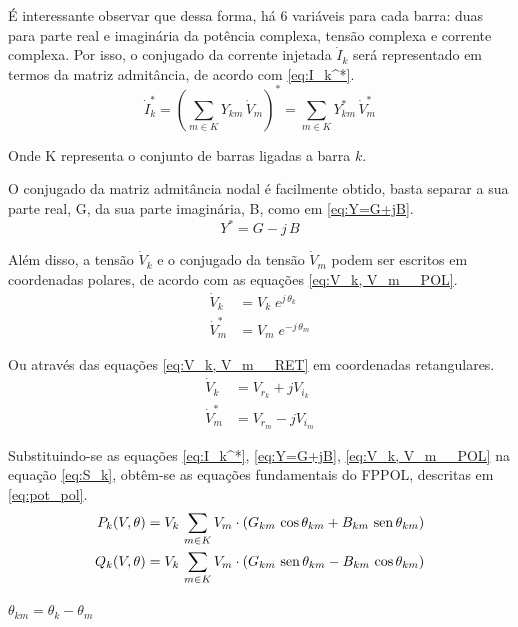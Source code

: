 É interessante observar que dessa forma, há 6 variáveis para cada barra: duas para parte real e imaginária da potência complexa, tensão complexa e corrente complexa. Por isso, o conjugado da corrente injetada $\Dot I_k$ será representado em termos da matriz admitância, de acordo com \eqref{eq:I_k^*}.
\begin{equation} \label{eq:I_k^*}
    \Dot I_k^* = (\sum_{m \in K} Y_{km}\, \Dot V_m)^* = \sum_{m \in K} Y_{km}^*\, \Dot V_m^* 
\end{equation}

Onde K representa o conjunto de barras ligadas a barra $k$.

O conjugado da matriz admitância nodal é facilmente obtido, basta separar a sua parte real, \ac{G}, da sua parte imaginária, \ac{B}, como em \eqref{eq:Y=G+jB}.
\begin{equation} \label{eq:Y=G+jB}
        Y^* = G - j\,B
\end{equation}

Além disso, a tensão $\Dot V_k$ e o conjugado da tensão $\Dot V_m$ podem ser escritos em coordenadas polares, de acordo com as equações \eqref{eq:V_k, V_m__POL}.
\begin{equation} \label{eq:V_k, V_m__POL}
    \begin{split}
        \Dot{V}_k &= V_k \; e^{j \, \theta_k}\\
        \Dot{V}^*_m &= V_m \; e^{-j \, \theta_m}
    \end{split}
\end{equation}

Ou através das equações \eqref{eq:V_k, V_m__RET} em coordenadas retangulares.
\begin{equation} \label{eq:V_k, V_m__RET}
    \begin{split}
        \Dot{V}_{k} &= V_{r_k} + jV_{i_k}\\
        \Dot{V}^*_m &= V_{r_m} - jV_{i_m}
    \end{split}
\end{equation}

Substituindo-se as equações \eqref{eq:I_k^*}, \eqref{eq:Y=G+jB}, \eqref{eq:V_k, V_m__POL} na equação \eqref{eq:S_k}, obtêm-se as equações fundamentais do \ac{FPPOL}, descritas em \eqref{eq:pot_pol}.
\begin{equation} \label{eq:pot_pol}
    \begin{split}
         P_k(V, \theta) &= V_k \, \sum_{m \in K} V_m \cdot (G_{km} \, \cos{\theta_{km}} + B_{km} \, \operatorname{sen}{\theta_{km}})\\
         Q_k(V, \theta) &= V_k \, \sum_{m \in K} V_m \cdot (G_{km} \, \operatorname{sen}{\theta_{km}} - B_{km} \, \cos{\theta_{km}})
    \end{split}
\end{equation}
\begin{center}
    $\theta _{km} = \theta_k - \theta_m$
\end{center}

